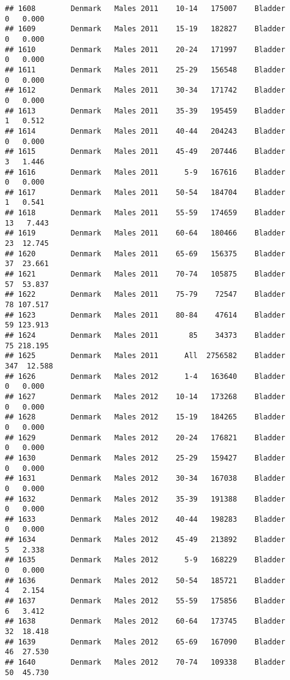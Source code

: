 \documentclass[
]{article}
\begin{document}
\begin{verbatim}
## 1608        Denmark   Males 2011    10-14   175007    Bladder      0   0.000
## 1609        Denmark   Males 2011    15-19   182827    Bladder      0   0.000
## 1610        Denmark   Males 2011    20-24   171997    Bladder      0   0.000
## 1611        Denmark   Males 2011    25-29   156548    Bladder      0   0.000
## 1612        Denmark   Males 2011    30-34   171742    Bladder      0   0.000
## 1613        Denmark   Males 2011    35-39   195459    Bladder      1   0.512
## 1614        Denmark   Males 2011    40-44   204243    Bladder      0   0.000
## 1615        Denmark   Males 2011    45-49   207446    Bladder      3   1.446
## 1616        Denmark   Males 2011      5-9   167616    Bladder      0   0.000
## 1617        Denmark   Males 2011    50-54   184704    Bladder      1   0.541
## 1618        Denmark   Males 2011    55-59   174659    Bladder     13   7.443
## 1619        Denmark   Males 2011    60-64   180466    Bladder     23  12.745
## 1620        Denmark   Males 2011    65-69   156375    Bladder     37  23.661
## 1621        Denmark   Males 2011    70-74   105875    Bladder     57  53.837
## 1622        Denmark   Males 2011    75-79    72547    Bladder     78 107.517
## 1623        Denmark   Males 2011    80-84    47614    Bladder     59 123.913
## 1624        Denmark   Males 2011       85    34373    Bladder     75 218.195
## 1625        Denmark   Males 2011      All  2756582    Bladder    347  12.588
## 1626        Denmark   Males 2012      1-4   163640    Bladder      0   0.000
## 1627        Denmark   Males 2012    10-14   173268    Bladder      0   0.000
## 1628        Denmark   Males 2012    15-19   184265    Bladder      0   0.000
## 1629        Denmark   Males 2012    20-24   176821    Bladder      0   0.000
## 1630        Denmark   Males 2012    25-29   159427    Bladder      0   0.000
## 1631        Denmark   Males 2012    30-34   167038    Bladder      0   0.000
## 1632        Denmark   Males 2012    35-39   191388    Bladder      0   0.000
## 1633        Denmark   Males 2012    40-44   198283    Bladder      0   0.000
## 1634        Denmark   Males 2012    45-49   213892    Bladder      5   2.338
## 1635        Denmark   Males 2012      5-9   168229    Bladder      0   0.000
## 1636        Denmark   Males 2012    50-54   185721    Bladder      4   2.154
## 1637        Denmark   Males 2012    55-59   175856    Bladder      6   3.412
## 1638        Denmark   Males 2012    60-64   173745    Bladder     32  18.418
## 1639        Denmark   Males 2012    65-69   167090    Bladder     46  27.530
## 1640        Denmark   Males 2012    70-74   109338    Bladder     50  45.730

\end{verbatim}
\end{document}
